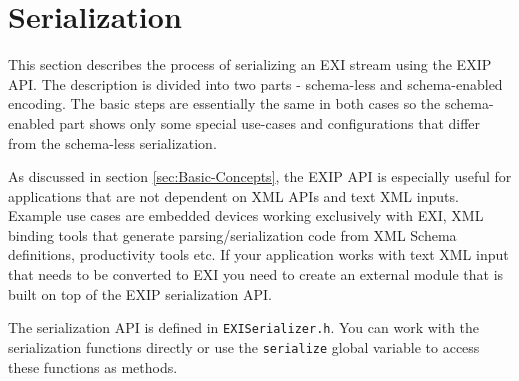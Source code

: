 \section{Serialization}
\label{sec:Serialization}

This section describes the process of serializing an EXI stream using the EXIP API.
The description is divided into two parts - schema-less and schema-enabled encoding.
The basic steps are essentially the same in both cases so the schema-enabled part
shows only some special use-cases and configurations that differ from the schema-less
serialization. 

As discussed in section \ref{sec:Basic-Concepts}, the EXIP API is especially useful
for applications that are not dependent on XML APIs and text XML inputs. Example
use cases are embedded devices working exclusively with EXI, XML binding tools
that generate parsing/serialization code from XML Schema definitions, productivity tools
etc. If your application works with text XML input that needs to be converted to EXI
you need to create an external module that is built on top of the EXIP serialization API.

The serialization API is defined in \texttt{EXISerializer.h}. You can work with the
serialization functions directly or use the \texttt{serialize} global variable to
access these functions as methods.
 
